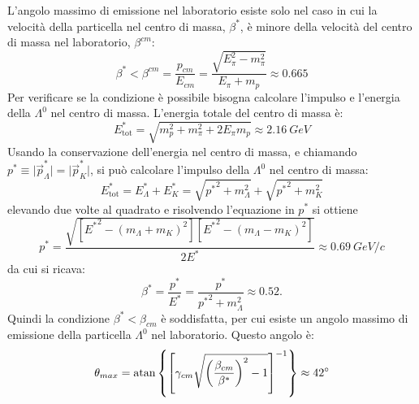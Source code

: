 \begin{Answer}
  L'angolo massimo di emissione nel laboratorio esiste solo nel caso in cui la velocit\`a della particella
  nel centro di massa, $\beta^*$, \`e minore della velocit\`a del centro di massa nel laboratorio, $\beta^{cm}$:
  \[
  \beta^* < \beta^{cm} = \frac{p_{cm}}{E_{cm}} = \frac{\sqrt{E_\pi^2-m_\pi^2}}{E_\pi+m_p} \approx 0.665
  \]
  Per verificare se la condizione \`e possibile bisogna calcolare l'impulso e l'energia della $\Lambda^0$ nel centro di massa.
  L'energia totale del centro di massa \`e:  
  \[
  E^*_\textrm{tot} = \sqrt{m_p^2+m_\pi^2+2E_\pi m_p} \approx \SI{2.16}{GeV}
  \]
  Usando la conservazione dell'energia nel centro di massa, e chiamando $p^* \equiv \vert \vec p^*_\Lambda\vert = \vert \vec p^*_K\vert$,
  si pu\`o calcolare l'impulso della $\Lambda^0$ nel centro di massa:
  \[
  E^*_\textrm{tot} = E^*_\Lambda + E^*_K = \sqrt{{p^*}^2+m_\Lambda^2} + \sqrt{{p^*}^2+m_K^2}
  \]
  elevando due volte al quadrato e risolvendo l'equazione in $p^*$ si ottiene
  \[
  p^* = \frac{\sqrt{[{E^*}^2-(m_\Lambda + m_K)^2][{E^*}^2-(m_\Lambda - m_K)^2]}}{2E^*} \approx \SI{0.69}{GeV/c}
  \]
  da cui si ricava:
  \[
  \beta^* = \frac{p^*}{E^*} = \frac{p^*}{{p^*}^2+m_\Lambda^2} \approx 0.52.
  \]
  Quindi la condizione $\beta^*<\beta_{cm}$ \`e soddisfatta, per cui esiste un angolo massimo di emissione della particella $\Lambda^0$ nel laboratorio.
  Questo angolo \`e:
  \[
  \theta_{max} = \atan \left\{ \left[ \gamma_{cm}\sqrt{\left(\frac{\beta_{cm}}{\beta^*}\right)^2-1}\right]^{-1}\right\} \approx 42^\circ
  \]
\end{Answer}

